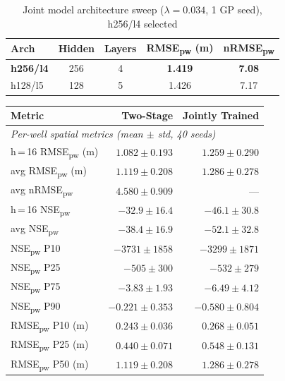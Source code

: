 \begin{table}[htbp]
\centering
\caption{Joint model architecture sweep ($\lambda = 0.034$, 1 GP seed), h256/l4 selected}
\label{tab:arch_sweep}
\begin{tabular}{lcccc}
\toprule
\textbf{Arch} & \textbf{Hidden} & \textbf{Layers} & \textbf{RMSE\textsubscript{pw} (m)} & \textbf{nRMSE\textsubscript{pw}} \\
\midrule
\textbf{h256/l4} & 256 & 4 & \textbf{1.419} & \textbf{7.08} \\
h128/l5          & 128 & 5 & 1.426          & 7.17 \\
\bottomrule
\end{tabular}
\end{table}

\begin{table}[htbp]
\centering
\begin{tabular}{lrr}
\toprule
\textbf{Metric} & \textbf{Two-Stage} & \textbf{Jointly Trained} \\
\midrule
\multicolumn{3}{l}{\textit{Per-well spatial metrics (mean $\pm$ std, 40 seeds)}} \\[2pt]
h\,=\,16 RMSE\textsubscript{pw} (m)        & $1.082 \pm 0.193$ & $1.259 \pm 0.290$ \\
avg RMSE\textsubscript{pw} (m)              & $1.119 \pm 0.208$ & $1.286 \pm 0.278$ \\
avg nRMSE\textsubscript{pw}                 & $4.580 \pm 0.909$ & --- \\
h\,=\,16 NSE\textsubscript{pw}              & $-32.9 \pm 16.4$  & $-46.1 \pm 30.8$ \\
avg NSE\textsubscript{pw}                   & $-38.4 \pm 16.9$  & $-52.1 \pm 32.8$ \\
NSE\textsubscript{pw} P10                   & $-3731 \pm 1858$  & $-3299 \pm 1871$ \\
NSE\textsubscript{pw} P25                   & $-505 \pm 300$    & $-532 \pm 279$ \\
NSE\textsubscript{pw} P75                   & $-3.83 \pm 1.93$  & $-6.49 \pm 4.12$ \\
NSE\textsubscript{pw} P90                   & $-0.221 \pm 0.353$ & $-0.580 \pm 0.804$ \\
RMSE\textsubscript{pw} P10 (m)              & $0.243 \pm 0.036$ & $0.268 \pm 0.051$ \\
RMSE\textsubscript{pw} P25 (m)              & $0.440 \pm 0.071$ & $0.548 \pm 0.131$ \\
RMSE\textsubscript{pw} P50 (m)              & $1.119 \pm 0.208$ & $1.286 \pm 0.278$ \\

\end{tabular}
\end{table}
